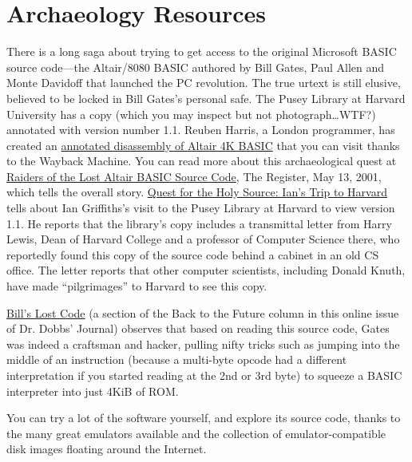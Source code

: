 \documentclass{article}
\begin{document}
\section{Archaeology Resources}


There is a long saga about trying to get access to the original
Microsoft BASIC source code---the Altair/8080 BASIC authored by Bill
Gates, Paul Allen and Monte Davidoff that launched the PC revolution.
The true urtext is still elusive, believed to be locked in Bill Gates's
personal safe.
The Pusey Library at Harvard University has a copy (which you may
inspect but not photograph\ldots{}WTF?) annotated with version number
1.1.
Reuben Harris, a London programmer, has created an
\href{http://web.archive.org/web/20011211233332/www.rjh.org.uk/altair/4k/index2.html}{annotated
disassembly of Altair 4K BASIC} that you can visit thanks to the
Wayback Machine.
You can read more about this archaeological quest at
\href{http://www.theregister.co.uk/2001/05/13/raiders_of_the_lost_altair/}{Raiders
of the Lost Altair BASIC Source Code}, The Register, May 13, 2001,
which tells the overall story.
\href{http://www.interact-sw.co.uk/altair/other\%20versions/ian.htm}{Quest
for the Holy Source: Ian's Trip to Harvard} tells about Ian
Griffiths's visit to the Pusey Library at Harvard to view version
1.1.
He reports that the library's copy includes a transmittal letter from
Harry Lewis, Dean of Harvard College and a professor of Computer
Science there, who reportedly found this copy of the source code behind
a cabinet in an old CS office.
The letter reports that other computer scientists, including Donald
Knuth, have made ``pilgrimages'' to Harvard to see this copy.

\href{http://www.drdobbs.com/back-to-the-future/184404733}{Bill's
  Lost Code} (a section of the Back to the Future column in this online
issue of Dr. Dobbs' Journal) observes that based on reading this source
code, Gates was indeed a craftsman and hacker, pulling nifty tricks such
as jumping into the middle of an instruction (because a multi-byte
opcode had a different interpretation if you started reading at the 2nd
or 3rd byte) to squeeze a BASIC interpreter into just 4KiB of ROM.

You can try a lot of the software yourself, and explore
its source code, thanks to the many great emulators available and the
collection of emulator-compatible disk images floating around the Internet.
\end{document}
